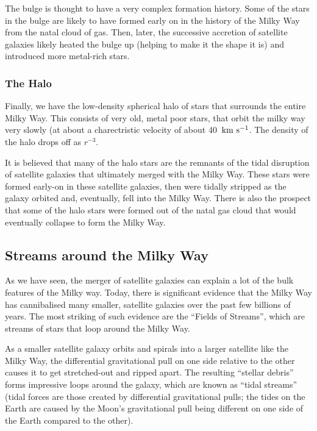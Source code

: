 \documentclass[11pt]{article}
\begin{document}
The bulge is thought to have a very complex formation history. Some of
the stars in the bulge are likely to have formed early on in the
history of the Milky Way from the natal cloud of gas. Then, later, the
successive accretion of satellite galaxies likely heated the bulge up
(helping to make it the shape it is) and introduced more metal-rich
stars.

\subsubsection{The Halo}
Finally, we have the low-density spherical halo of stars that
surrounds the entire Milky Way. This consists of very old, metal poor
stars, that orbit the milky way very slowly (at about a charectristic
velocity of about 40~${\rm km~s^{-1}}$. The density of the halo drops
off as $r^{-3}$.

It is believed that many of the halo stars are the remnants of the
tidal disruption of satellite galaxies that ultimately merged with the
Milky Way. These stars were formed early-on in these satellite
galaxies, then were tidally stripped as the galaxy orbited and,
eventually, fell into the Milky Way. There is also the prospect that
some of the halo stars were formed out of the natal gas cloud that
would eventually collapse to form the Milky Way.

\subsection{Streams around the Milky Way}
As we have seen, the merger of satellite galaxies can explain a lot of
the bulk features of the Milky way. Today, there is significant
evidence that the Milky Way has cannibalised many smaller, satellite
galaxies over the past few billions of years. The most striking of
such evidence are the ``Fields of Streams'', which are streams of
stars that loop around the Milky Way.

As a smaller satellite galaxy orbits and spirals into a larger
satellite like the Milky Way, the differential gravitational pull on
one side relative to the other causes it to get stretched-out and
ripped apart. The resulting ``stellar debris'' forms impressive loops
around the galaxy, which are known as ``tidal streams'' (tidal forces
are those created by differential gravitational pulls; the tides on
the Earth are caused by the Moon's gravitational pull being different
on one side of the Earth compared to the other). 
\end{document}
